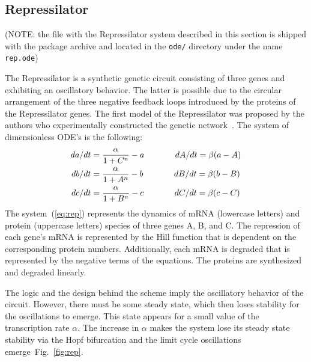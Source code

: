 \documentclass[11pt,a4paper]{article}
\begin{document}
\subsection{Repressilator}
\label{sec:repressilator}

(NOTE: the file with the Repressilator system described in this section is shipped
with the package archive and located in the \texttt{ode/} directory under the name
\texttt{rep.ode})

The Repressilator is a synthetic genetic circuit consisting of three genes and
exhibiting an oscillatory behavior. The latter is possible due to the circular
arrangement of the three negative feedback loops introduced by the proteins of the
Repressilator genes. The first model of the Repressilator was proposed by the authors
who experimentally constructed the genetic
network~\cite{Elowitz2000,RepLink,RepLinkBioModels}. The system of dimensionless
ODE's is the following:
\begin{align}
  \label{eq:rep}
  \begin{split}
    da/dt &= \frac{\alpha}{1+C^n} - a \hspace{1.3cm} dA/dt = \beta(a-A)\\
    db/dt &= \frac{\alpha}{1+A^n} - b \hspace{1.3cm} dB/dt = \beta(b-B)\\
    dc/dt &= \frac{\alpha}{1+B^n} - c \hspace{1.3cm} dC/dt = \beta(c-C)\\
  \end{split}
\end{align}
The system~(\ref{eq:rep}) represents the dynamics of mRNA (lowercase letters) and
protein (uppercase letters) species of three genes A, B, and C. The repression of
each gene's mRNA is represented by the Hill function that is dependent on the
corresponding protein numbers. Additionally, each mRNA is degraded that is
represented by the negative terms of the equations. The proteins are synthesized and
degraded linearly.

The logic and the design behind the scheme imply the oscillatory behavior of the
circuit. However, there must be some steady state, which then loses stability for the
oscillations to emerge. This state appears for a small value of the transcription
rate $\alpha$. The increase in $\alpha$ makes the system lose its steady state
stability via the Hopf bifurcation and the limit cycle oscillations
emerge~Fig.~\ref{fig:rep}.
\end{document}
